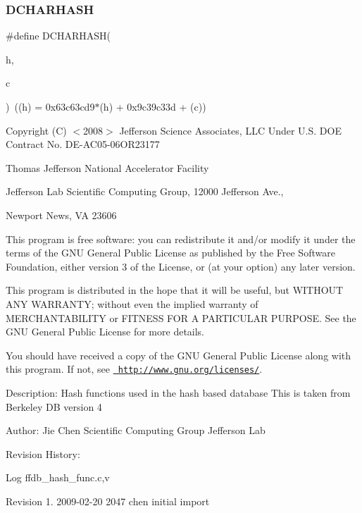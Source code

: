 \subsubsection{\texorpdfstring{DCHARHASH}{DCHARHASH}}
{\footnotesize\ttfamily \#define D\+C\+H\+A\+R\+H\+A\+SH(\begin{DoxyParamCaption}\item[{}]{h,  }\item[{}]{c }\end{DoxyParamCaption})~((h) = 0x63c63cd9$\ast$(h) + 0x9c39c33d + (c))}

Copyright (C) $<$2008$>$ Jefferson Science Associates, L\+LC Under U.\+S. D\+OE Contract No. D\+E-\/\+A\+C05-\/06\+O\+R23177

Thomas Jefferson National Accelerator Facility

Jefferson Lab Scientific Computing Group, 12000 Jefferson Ave.,

Newport News, VA 23606

This program is free software\+: you can redistribute it and/or modify it under the terms of the G\+NU General Public License as published by the Free Software Foundation, either version 3 of the License, or (at your option) any later version.

This program is distributed in the hope that it will be useful, but W\+I\+T\+H\+O\+UT A\+NY W\+A\+R\+R\+A\+N\+TY; without even the implied warranty of M\+E\+R\+C\+H\+A\+N\+T\+A\+B\+I\+L\+I\+TY or F\+I\+T\+N\+E\+SS F\+OR A P\+A\+R\+T\+I\+C\+U\+L\+AR P\+U\+R\+P\+O\+SE. See the G\+NU General Public License for more details.

You should have received a copy of the G\+NU General Public License along with this program. If not, see \href{http://www.gnu.org/licenses/}{\texttt{ http\+://www.\+gnu.\+org/licenses/}}. 

 Description\+: Hash functions used in the hash based database This is taken from Berkeley DB version 4

Author\+: Jie Chen Scientific Computing Group Jefferson Lab

Revision History\+: \begin{DoxyParagraph}{Log}
ffdb\+\_\+hash\+\_\+func.\+c,v 
\end{DoxyParagraph}
Revision 1. 2009-\/02-\/20 2047 chen initial import \mbox{\label{adat-devel_2other__libs_2filedb_2filehash_2ffdb__hash__func_8c_a7740ad2d66952fc26f801a9dcf76bae5}} 
